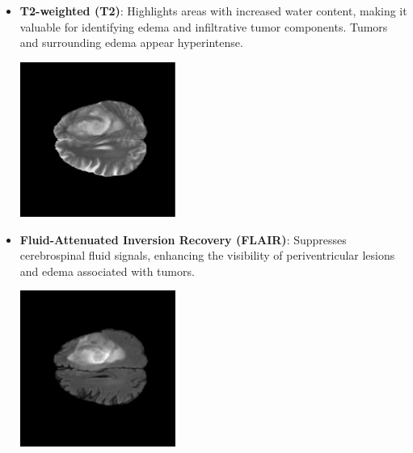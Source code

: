 \begin{itemize}
  \item \textbf{T2-weighted (T2)}: Highlights areas with increased water content, making it valuable for identifying edema and infiltrative tumor components. Tumors and surrounding edema appear hyperintense.

        \begin{minipage}{\linewidth}
          \centering
          \includegraphics[width=0.4\textwidth]{./Images/Chapter2/t2.png}
          \captionsetup{hypcap=false}
          \label{fig:t2}
        \end{minipage}
        \vspace{\baselineskip}

  \item \textbf{Fluid-Attenuated Inversion Recovery (FLAIR)}: Suppresses cerebrospinal fluid signals, enhancing the visibility of periventricular lesions and edema associated with tumors.

        \begin{minipage}{\linewidth}
          \centering
          \includegraphics[width=0.4\textwidth]{./Images/Chapter2/flair.png}
          \captionsetup{hypcap=false}
          \label{fig:t2-flair}
        \end{minipage}
        \vspace{\baselineskip}
\end{itemize}


